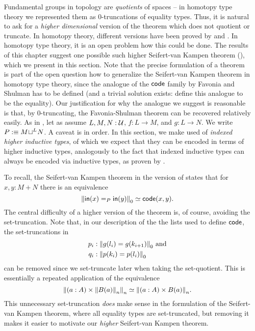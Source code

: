 Fundamental groups in topology are \emph{quotients} of spaces --
in homotopy type theory we represented them as 0-truncations of equality types.
Thus, it is natural to ask for a \emph{higher dimensional} version of the theorem
which does not quotient or truncate.
In homotopy theory, different versions have been proved by \cite{lurie18derived}
and \cite{brown2011nonabelian}.
In homotopy type theory, it is an open problem how this could be done.
The results of this chapter suggest one possible such higher Seifert-van Kampen theorem
(),
which we present in this section.
Note that the precise formulation of a theorem is part of the open question how
to generalize the Seifert-van Kampen theorem in homotopy type theory,
since the analogue of the $\code$ family by Favonia and Shulman has to be defined
(and a trivial solution exists: define this analogue to be the equality).
Our justification for why the analogue we suggest is reasonable is that, by
$0$-truncating, the Favonia-Shulman theorem can be recovered relatively easily.
As in , let as assume $L, M, N : \UU$,
$f : L \to M$, and $g : L \to N$. We write $P :\equiv \pout{L}{M}{N}$.
A caveat is in order.
In this section, we make used of \emph{indexed higher inductive types},
of which we expect that they can be encoded in terms of higher inductive types,
analogously to the fact that indexed inductive types can always be encoded via
inductive types, as proven by \cite{indexedcontainers,Sattler:indexedW}.

To recall, the Seifert-van Kampen theorem in the version of
\cite{favonia:SvK} states that for $x, y : M + N$ there is an equivalence
\begin{equation*}
\trunc{0}{\inp(x) =_P \inp(y)} \simeq \code(x,y) \text{.}
\end{equation*}
The central difficulty of a higher version of the theorem is, of course,
avoiding the set-truncation.
Note that, in our description of the the lists used to define $\code$,
the set-truncations in 
\begin{align*}
p_i &: \trunc 0 {g(l_i) = g(k_{i+1})} \text{ and} \\
q_i &: \trunc 0 {p(k_i) = p(l_i)}
\end{align*}
can be removed since we set-truncate later
when taking the set-quotient.
This is essentially a repeated application of the equivalence
\begin{equation*}
 \trunc{n}{(a:A) \times \trunc{n}{B(a)}} \simeq \trunc{n}{(a:A) \times B(a)}.
\end{equation*}
This unnecessary set-truncation \emph{does} make sense in the formulation of the
Seifert-van Kampen theorem, where all equality types are set-truncated, but
removing it makes it easier to motivate our \emph{higher} Seifert-van Kampen theorem.

